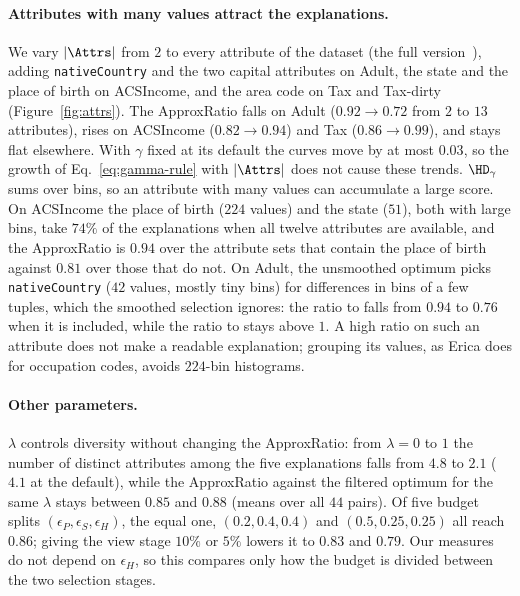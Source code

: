 \paragraph{Attributes with many values attract the explanations.}
\label{subsec:attrs}
We vary $|\Attrs|$ from $2$ to every attribute of the dataset (\ifpaper the full version~\cite{fullversion}\else {}\fi), adding \texttt{nativeCountry} and the two capital attributes on Adult, the state and the place of birth on ACSIncome, and the area code on Tax and Tax-dirty (Figure~\ref{fig:attrs}).
The ApproxRatio falls on Adult ($0.92\rightarrow0.72$ from $2$ to $13$ attributes), rises on ACSIncome ($0.82\rightarrow0.94$) and Tax ($0.86\rightarrow0.99$), and stays flat elsewhere.
With $\gamma$ fixed at its default the curves move by at most $0.03$, so the growth of Eq.~\eqref{eq:gamma-rule} with $|\Attrs|$ does not cause these trends.
$\HD_\gamma$ sums over bins, so an attribute with many values can accumulate a large score.
On ACSIncome the place of birth ($224$ values) and the state ($51$), both with large bins, take $74\%$ of the explanations when all twelve attributes are available, and the ApproxRatio is $0.94$ over the attribute sets that contain the place of birth against $0.81$ over those that do not.
On Adult, the unsmoothed optimum picks \texttt{nativeCountry} ($42$ values, mostly tiny bins) for differences in bins of a few tuples, which the smoothed selection ignores: the ratio to \Bthree{} falls from $0.94$ to $0.76$ when it is included, while the ratio to \Bone{} stays above $1$.
A high ratio on such an attribute does not make a readable explanation; grouping its values, as Erica does for occupation codes, avoids $224$-bin histograms.

\paragraph{Other parameters.}
$\lambda$ controls diversity without changing the ApproxRatio: from $\lambda=0$ to $1$ the number of distinct attributes among the five explanations falls from $4.8$ to $2.1$ ($4.1$ at the default), while the ApproxRatio against the filtered optimum for the same $\lambda$ stays between $0.85$ and $0.88$ (means over all $44$ pairs).
Of five budget splits $(\epsilon_P,\epsilon_S,\epsilon_H)$, the equal one, $(0.2,0.4,0.4)$ and $(0.5,0.25,0.25)$ all reach $0.86$; giving the view stage $10\%$ or $5\%$ lowers it to $0.83$ and $0.79$.
Our measures do not depend on $\epsilon_H$, so this compares only how the budget is divided between the two selection stages.

